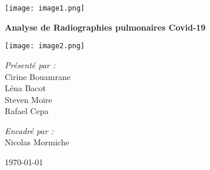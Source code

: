\begin{titlepage}
    \centering
    
    \texttt{[image: image1.png]}
    
    \vspace{2cm} %
    
    {\Huge \bfseries Analyse de Radiographies pulmonaires Covid-19 \par}
    
    \vspace{1.5cm} %
    
    \texttt{[image: image2.png]}
    
    \vspace{2cm} %
    
    \begin{minipage}{0.4\textwidth}
        \begin{flushleft} \large
            \emph{Présenté par :}\\
            \vspace{0.5cm}
            Cirine Bouamrane \\
            Léna Bacot \\
            Steven Moire \\
            Rafael Cepa
        \end{flushleft}
    \end{minipage}
    \begin{minipage}{0.4\textwidth}
        \begin{flushright} \large
            \emph{Encadré par :}\\
            \vspace{0.5cm}
            Nicolas Mormiche
        \end{flushright}
    \end{minipage}

    \vfill %
    
    {\large \today \par}
    
\end{titlepage}

